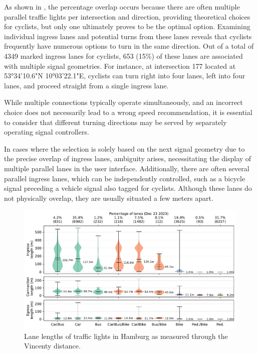 As shown in , the percentage overlap occurs because there are often multiple parallel traffic lights per intersection and direction, providing theoretical choices for cyclists, but only one ultimately proves to be the optimal option. Examining individual ingress lanes and potential turns from these lanes reveals that cyclists frequently have numerous options to turn in the same direction. Out of a total of 4349 marked ingress lanes for cyclists, 653 (15\%) of these lanes are associated with multiple signal geometries. For instance, at intersection 177 located at 53°34'10.6"N 10°03'22.1"E, cyclists can turn right into four lanes, left into four lanes, and proceed straight from a single ingress lane.

While multiple connections typically operate simultaneously, and an incorrect choice does not necessarily lead to a wrong speed recommendation, it is essential to consider that different turning directions may be served by separately operating signal controllers.

In cases where the selection is solely based on the next signal geometry due to the precise overlap of ingress lanes, ambiguity arises, necessitating the display of multiple parallel lanes in the user interface. Additionally, there are often several parallel ingress lanes, which can be independently controlled, such as a bicycle signal preceding a vehicle signal also tagged for cyclists. Although these lanes do not physically overlap, they are usually situated a few meters apart.

\begin{figure}[htbp]
\centering
\includegraphics[width=\linewidth]{images/lanes-lengths.pdf}
\caption{Lane lengths of traffic lights in Hamburg as measured through the Vincenty distance.}
\label{fig:ingress-lane-lengths}
\end{figure}


